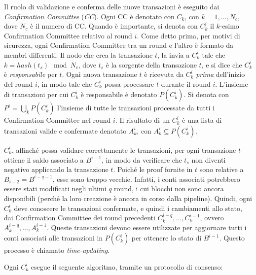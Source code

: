 Il ruolo di validazione e conferma delle nuove transazioni è eseguito dai \emph{Confirmation Committee} (\emph{CC}). Ogni CC è denotato con $C_k$, con $k = 1, \dots, N_c$, dove $N_c$ è il numero di CC. Quando è importante, si denota con $C_k^i$ il $k$-esimo Confirmation Committee relativo al round $i$. Come detto prima, per motivi di sicurezza, ogni Confirmation Committee tra un round e l'altro è formato da membri differenti. Il nodo che crea la transazione $t$, la invia a $C_k^i$ tale che $k = hash(t_s) \mod N_c$, dove $t_s$ è la sorgente della transazione $t$, e si dice che $C_k^i$ è \emph{responsabile} per $t$. Ogni nuova transazione $t$ è ricevuta da $C_k^i$ \emph{prima} dell'inizio del round $i$, in modo tale che $C_k^i$ possa processare $t$ durante il round $i$. L'insieme di transazioni per cui $C_k^i$ è responsabile è denotato $P(C_k^i)$. Si denota con $P^i = \bigcup_k P(C_k^i)$ l'insieme di tutte le transazioni processate da tutti i Confirmation Committee nel round $i$. Il risultato di un $C_k^i$ è una lista di transazioni valide e confermate denotato $A_k^i$, con $A_k^i \subseteq P(C_k^i)$.

$C_k^i$, affinché possa validare correttamente le transazioni, per ogni transazione $t$ ottiene il saldo associato a $B^{i-1}$, in modo da verificare che $t_s$ non diventi negativo applicando la transazione $t$. Poiché le proof fornite in $t$ sono relative a $B_{i-2} = B^{i-q-1}$, esse sono troppo vecchie. Infatti, i conti associati potrebbero essere stati modificati negli ultimi $q$ round, i cui blocchi non sono ancora disponibili (perché la loro creazione è ancora in corso dalla pipeline). Quindi, ogni $C_k^i$ deve conoscere le transazioni confermate, e quindi i cambiamenti allo stato, dai Confirmation Committee dei round precedenti $C_k^{i-q}, \dots, C_k^{i-1}$, ovvero $A_k^{i-q}, \dots, A_k^{i-1}$. Queste transazioni devono essere utilizzate per aggiornare tutti i conti associati alle transazioni in $P(C_k^i)$ per ottenere lo stato di $B^{i-1}$. Questo processo è chiamato \emph{time-updating}.

Ogni $C_k^i$ esegue il seguente algoritmo, tramite un protocollo di consenso:

